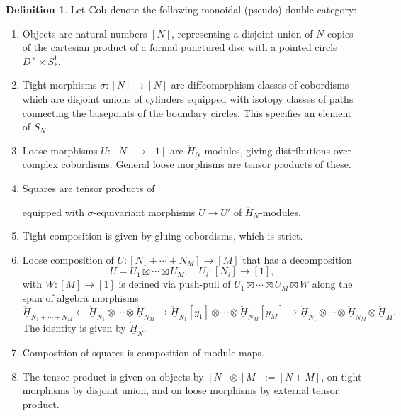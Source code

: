 \documentclass[11pt]{report}
\theoremstyle{definition}
\newtheorem{definition}[theorem]{Definition}
\theoremstyle{remark}
\theoremstyle{remark}
\newcommand{\id}{\textnormal{id}}
\begin{document}
\begin{definition}
Let $\mathbb{C}\textnormal{ob}$ denote the following monoidal (pseudo) double category:
\begin{enumerate}[label=(\roman*)]
\item Objects are natural numbers $[N]$, representing a disjoint union of $N$ copies of the cartesian product of a formal punctured disc with a pointed circle $D^\times \times S_*^1$.
\item Tight morphisms $\sigma: [N] \to [N]$ are diffeomorphism classes of cobordisms which are disjoint unions of cylinders equipped with isotopy classes of paths connecting the basepoints of the boundary circles. This specifies an element of $\dot S_N$.
\item Loose morphisms $U: [N] \to [1]$ are $\ddot H_N$-modules, giving distributions over complex cobordisms. General loose morphisms are tensor products of these.
\item Squares are tensor products of
\begin{center}
\end{center}
equipped with $\sigma$-equivariant morphisms $U \to U'$ of $\ddot H_N$-modules.
\item Tight composition is given by gluing cobordisms, which is strict.
\item Loose composition of $U: [N_1+\cdots+N_M] \to [M]$ that has a decomposition
\begin{equation*}
U = U_1 \boxtimes \cdots \boxtimes U_M, \quad U_i: [N_i] \to [1],
\end{equation*}
with $W: [M] \to [1]$ is defined via push-pull of $U_1 \boxtimes \cdots \boxtimes U_M \boxtimes W$ along the span of algebra morphisms
\begin{equation*}
\underline{\ddot H}_{N_1+\cdots+N_M} \leftarrow \underline{\ddot H}_{N_1} \otimes \cdots \otimes \underline{\ddot H}_{N_M} \to \underline{\ddot H}_{N_1}[y_1] \otimes \cdots \otimes \underline{\ddot H}_{N_M}[y_M] \to \underline{\ddot H}_{N_1} \otimes  \cdots \otimes \underline{\ddot H}_{N_M} \otimes \underline{\ddot H}_M.
\end{equation*}
The identity is given by $\underline{\ddot H}_N$.
\item Composition of squares is composition of module maps.
\item The tensor product is given on objects by $[N] \otimes [M] := [N+M]$, on tight morphisms by disjoint union, and on loose morphisms by external tensor product.
\end{enumerate}
\end{definition}
\end{document}
